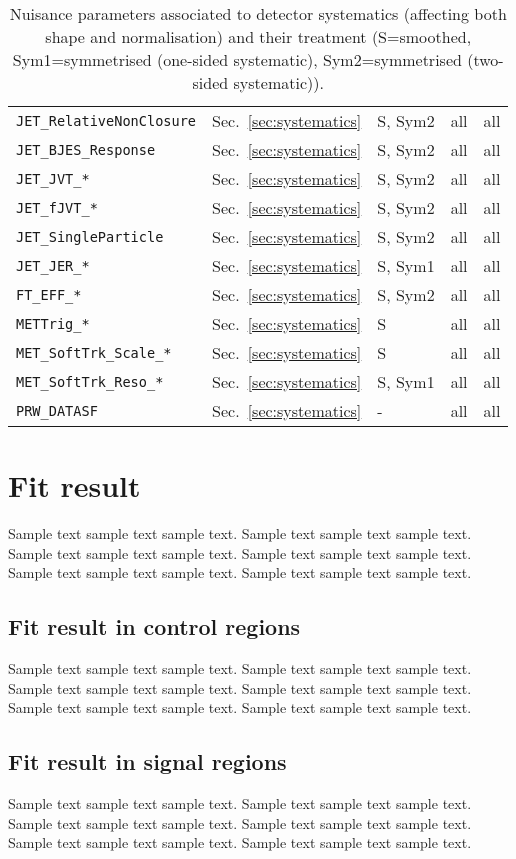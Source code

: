 \begin{table}[ht]
\begin{tabular}{|p{3.5cm}|p{2.0cm}|p{1.5cm}|p{2cm}|p{1.5cm}|}
        \texttt{JET\_RelativeNonClosure} & Sec.~\ref{sec:systematics} & S, Sym2 & all & all \\
        \texttt{JET\_BJES\_Response} & Sec.~\ref{sec:systematics} & S, Sym2 & all & all \\
        \texttt{JET\_JVT\_*} & Sec.~\ref{sec:systematics} & S, Sym2 & all & all \\
        \texttt{JET\_fJVT\_*} & Sec.~\ref{sec:systematics} & S, Sym2 & all & all \\
        \texttt{JET\_SingleParticle} & Sec.~\ref{sec:systematics} & S, Sym2 & all & all \\
        \texttt{JET\_JER\_*} & Sec.~\ref{sec:systematics} & S, Sym1 & all & all \\
        \texttt{FT\_EFF\_*} & Sec.~\ref{sec:systematics} & S, Sym2 & all & all \\
        \texttt{METTrig\_*} & Sec.~\ref{sec:systematics} & S & all & all \\
        \texttt{MET\_SoftTrk\_Scale\_*} & Sec.~\ref{sec:systematics} & S & all & all \\
        \texttt{MET\_SoftTrk\_Reso\_*} & Sec.~\ref{sec:systematics} & S, Sym1 & all & all \\
        \texttt{PRW\_DATASF} & Sec.~\ref{sec:systematics} & - & all & all \\
        \hline
    \end{tabular}
    \caption{Nuisance parameters associated to detector systematics (affecting both shape and normalisation) and their treatment (S=smoothed, Sym1=symmetrised (one-sided systematic), Sym2=symmetrised (two-sided systematic)).}
    \label{tab:np-shape}
\end{table}  


\section{Fit result}
Sample text sample text sample text. Sample text sample text sample text.
Sample text sample text sample text. Sample text sample text sample text.
Sample text sample text sample text. Sample text sample text sample text.

\subsection{Fit result in control regions}
Sample text sample text sample text. Sample text sample text sample text.
Sample text sample text sample text. Sample text sample text sample text.
Sample text sample text sample text. Sample text sample text sample text.

\subsection{Fit result in signal regions}
Sample text sample text sample text. Sample text sample text sample text.
Sample text sample text sample text. Sample text sample text sample text.
Sample text sample text sample text. Sample text sample text sample text.
